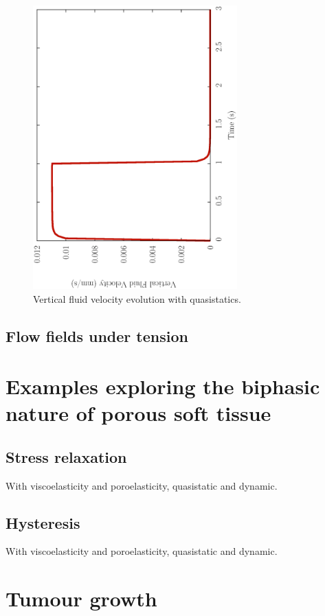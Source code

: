 \begin{figure}[!hpt]
\centering
\includegraphics[width=0.7\textwidth,angle=270]{images/examples/eulerian/constriction/constrict-vel-drop-quasistatic}
\caption{Vertical fluid velocity evolution with quasistatics.} 
\label{velocity-evolution-quasistatic}
\end{figure}

\subsection{Flow fields under tension}
\label{tension-flow}

\section{Examples exploring the biphasic nature of porous soft tissue}
\label{biphasic-examples-2}

\subsection{Stress relaxation}
\label{stress-relaxation}
With viscoelasticity and poroelasticity, quasistatic and dynamic.

\subsection{Hysteresis}
\label{hysteresis}
With viscoelasticity and poroelasticity, quasistatic and dynamic.

\section{Tumour growth}
\label{tumor-growth}

%

